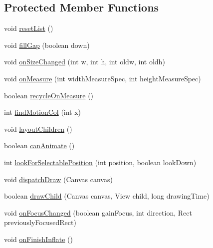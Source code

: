 \subsection*{Protected Member Functions}
\begin{DoxyCompactItemize}
\item 
void \hyperlink{classit_1_1sephiroth_1_1android_1_1library_1_1widget_1_1_h_list_view_aa29e867aefcd1ba11452e314c727720d}{reset\+List} ()
\item 
void \hyperlink{classit_1_1sephiroth_1_1android_1_1library_1_1widget_1_1_h_list_view_a517bd3089ff1ac0c6857d7529dbd0ffe}{fill\+Gap} (boolean down)
\item 
void \hyperlink{classit_1_1sephiroth_1_1android_1_1library_1_1widget_1_1_h_list_view_ae86533635cb9f00d8be4a3a6716f95c1}{on\+Size\+Changed} (int w, int h, int oldw, int oldh)
\item 
void \hyperlink{classit_1_1sephiroth_1_1android_1_1library_1_1widget_1_1_h_list_view_a5792e2b6b65c7ad7ce85e68d241bb94f}{on\+Measure} (int width\+Measure\+Spec, int height\+Measure\+Spec)
\item 
boolean \hyperlink{classit_1_1sephiroth_1_1android_1_1library_1_1widget_1_1_h_list_view_aeca501c8d335b386a7376ab70d9ffa0e}{recycle\+On\+Measure} ()
\item 
int \hyperlink{classit_1_1sephiroth_1_1android_1_1library_1_1widget_1_1_h_list_view_aa18ef5942aaa6867ff62edf225e6fde7}{find\+Motion\+Col} (int x)
\item 
void \hyperlink{classit_1_1sephiroth_1_1android_1_1library_1_1widget_1_1_h_list_view_a1c57a3e0210fb76c94f03def2ef0ebd9}{layout\+Children} ()
\item 
boolean \hyperlink{classit_1_1sephiroth_1_1android_1_1library_1_1widget_1_1_h_list_view_a432dfce858f114ab0a49411d17e0a3cf}{can\+Animate} ()
\item 
int \hyperlink{classit_1_1sephiroth_1_1android_1_1library_1_1widget_1_1_h_list_view_a731fc4a426306c5629109723ff749e45}{look\+For\+Selectable\+Position} (int position, boolean look\+Down)
\item 
void \hyperlink{classit_1_1sephiroth_1_1android_1_1library_1_1widget_1_1_h_list_view_a65544225d8b0d11e36d91904f71512c9}{dispatch\+Draw} (Canvas canvas)
\item 
boolean \hyperlink{classit_1_1sephiroth_1_1android_1_1library_1_1widget_1_1_h_list_view_ae50c65b7c0927414ea5cec1209de14b2}{draw\+Child} (Canvas canvas, View child, long drawing\+Time)
\item 
void \hyperlink{classit_1_1sephiroth_1_1android_1_1library_1_1widget_1_1_h_list_view_a9302d1c5da1ea00ccebedc080cc2f371}{on\+Focus\+Changed} (boolean gain\+Focus, int direction, Rect previously\+Focused\+Rect)
\item 
void \hyperlink{classit_1_1sephiroth_1_1android_1_1library_1_1widget_1_1_h_list_view_ac7a67487350e274b9a325d0614fe37ce}{on\+Finish\+Inflate} ()
\end{DoxyCompactItemize}
